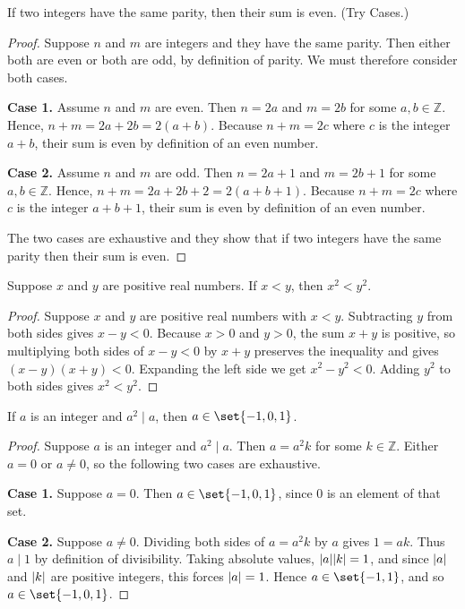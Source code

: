 \documentclass[DIN, pagenumber=false, fontsize=11pt, parskip=half]{scrartcl}
\begin{document}
\begin{problems}
    \problem If two integers have the same parity, then their sum is even. (Try Cases.)
    \begin{proof}
        Suppose $n$ and $m$ are integers and they have the same parity. 
        Then either both are even or both are odd, by definition of parity. 
        We must therefore consider both cases.

        \textbf{Case 1.} Assume $n$ and $m$ are even. 
        Then $n = 2a$ and $m = 2b$ for some $a,b \in \mathbb{Z}$. 
        Hence, $n + m = 2a + 2b = 2(a+b)$. 
        Because $n + m = 2c$ where $c$ is the integer $a+b$, their sum is even by definition of an even number.

        \textbf{Case 2.} Assume $n$ and $m$ are odd. 
        Then $n = 2a+1$ and $m = 2b+1$ for some $a,b \in \mathbb{Z}$. 
        Hence, $n + m = 2a+2b+2 = 2(a+b+1)$. 
        Because $n + m = 2c$ where $c$ is the integer $a+b+1$, their sum is even by definition of an even number.

        The two cases are exhaustive and they show that if two integers have the same parity then their sum is even.
    \end{proof}

    \problem Suppose $x$ and $y$ are positive real numbers. 
    If $x < y$, then $x^2 < y^2$.
    \begin{proof}
        Suppose $x$ and $y$ are positive real numbers with $x < y$. 
        Subtracting $y$ from both sides gives $x-y < 0$. 
        Because $x > 0$ and $y > 0$, the sum $x+y$ is positive, so multiplying both sides of $x-y < 0$ by $x+y$ preserves the inequality and gives $(x-y)(x+y) < 0$. 
        Expanding the left side we get $x^2-y^2 < 0$. Adding $y^2$ to both sides gives $x^2 < y^2$.
    \end{proof}

    \problem If $a$ is an integer and $a^2 \mid a$, then $a \in \set{-1,0,1}$.
    \begin{proof}
        Suppose $a$ is an integer and $a^2 \mid a$. Then $a = a^2k$ for some $k \in \mathbb{Z}$.
        Either $a = 0$ or $a \neq 0$, so the following two cases are exhaustive.

        \textbf{Case 1.} Suppose $a = 0$. 
        Then $a \in \set{-1,0,1}$, since $0$ is an element of that set.

        \textbf{Case 2.} Suppose $a \neq 0$. 
        Dividing both sides of $a = a^2k$ by $a$ gives $1 = ak$. 
        Thus $a \mid 1$ by definition of divisibility. 
        Taking absolute values, $\lvert a \rvert\lvert k \rvert = 1$, and since $\lvert a \rvert$ and $\lvert k \rvert$ are positive integers, this forces $\lvert a \rvert = 1$. 
        Hence $a \in \set{-1,1}$, and so $a \in \set{-1,0,1}$.


\end{proof}
\end{problems}
\end{document}
